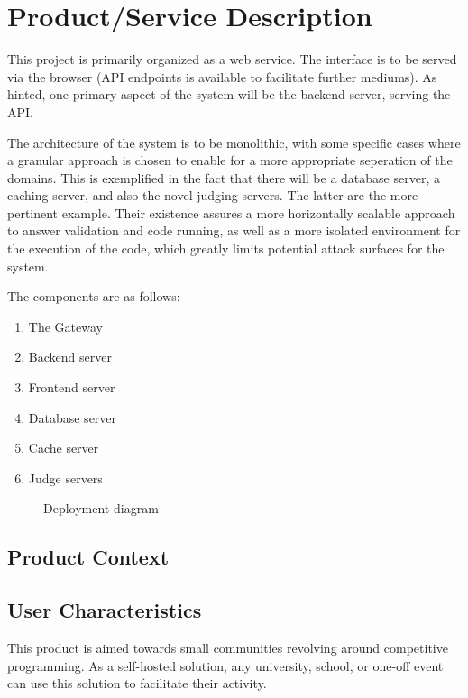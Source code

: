 \section{Product/Service Description}

This project is primarily organized as a web service. The interface is to be served via the browser (API endpoints is available to facilitate further mediums). As hinted, one primary aspect of the system will be the 
backend server, serving the API.

The architecture of the system is to be monolithic, with some specific cases where a granular approach is chosen to enable for a more appropriate seperation of the domains. This is exemplified in the
fact that there will be a database server, a caching server, and also the novel judging servers. The latter are the more pertinent example. Their existence assures a more horizontally scalable approach to answer validation and code
running, as well as a more isolated environment for the execution of the code, which greatly limits potential attack surfaces for the system.

The components are as follows:
\begin{enumerate}
    \item The Gateway
    \item Backend server
    \item Frontend server
    \item Database server
    \item Cache server
    \item Judge servers
\end{enumerate}

\begin{landscape}
    \begin{figure}
        \centering
        
        \caption{Deployment diagram}
    \end{figure}
\end{landscape}

\subsection{Product Context}

\subsection{User Characteristics}
This product is aimed towards small communities revolving around competitive programming. As a self-hosted solution,
any university, school, or one-off event can use this solution to facilitate their activity.

